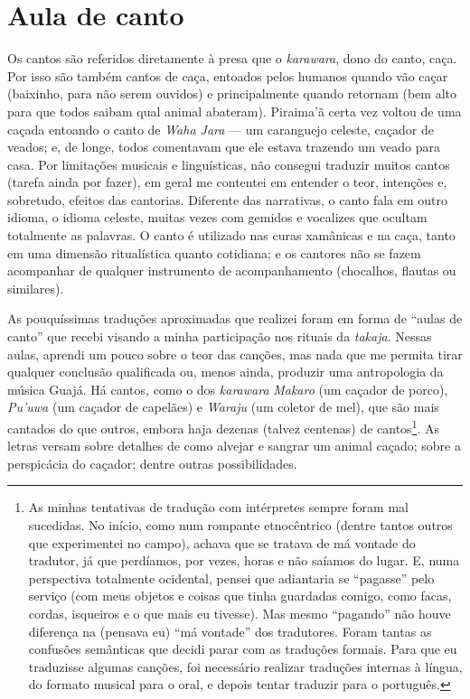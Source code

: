 \section{Aula de canto}

Os cantos são referidos diretamente à presa que o \emph{karawara}, dono
do canto, caça. Por isso são também cantos de caça, entoados pelos
humanos quando vão caçar (baixinho, para não serem ouvidos) e
principalmente quando retornam (bem alto para que todos saibam qual
animal abateram). Piraima'ã certa vez voltou de uma caçada entoando o
canto de \emph{Waha Jara} --- um caranguejo celeste, caçador de veados; e,
de longe, todos comentavam que ele estava trazendo um veado para casa.
Por limitações musicais e linguísticas, não consegui traduzir muitos
cantos (tarefa ainda por fazer), em geral me contentei em entender o
teor, intenções e, sobretudo, efeitos das cantorias. Diferente das
narrativas, o canto fala em outro idioma, o idioma celeste, muitas vezes
com gemidos e vocalizes que ocultam totalmente as palavras. O canto é
utilizado nas curas xamânicas e na caça, tanto em uma dimensão
ritualística quanto cotidiana; e os cantores não se fazem acompanhar de
qualquer instrumento de acompanhamento (chocalhos, flautas ou
similares).

As pouquíssimas traduções aproximadas que realizei foram em forma de
``aulas de canto'' que recebi visando a minha participação nos rituais da
\emph{takaja}. Nessas aulas, aprendi um pouco sobre o teor das canções,
mas nada que me permita tirar qualquer conclusão qualificada ou, menos
ainda, produzir uma antropologia da música Guajá. Há cantos, como o dos
\emph{karawara} \emph{Makaro} (um caçador de porco), \emph{Pu'uwa} (um
caçador de capelães) e \emph{Waraju} (um coletor de mel), que são mais
cantados do que outros, embora haja dezenas (talvez centenas) de
cantos\footnote{As minhas tentativas de tradução com intérpretes sempre
  foram mal sucedidas. No início, como num rompante etnocêntrico (dentre
  tantos outros que experimentei no campo), achava que se tratava de má
  vontade do tradutor, já que perdíamos, por vezes, horas e não saíamos
  do lugar. E, numa perspectiva totalmente ocidental, pensei que
  adiantaria se ``pagasse'' pelo serviço (com meus objetos e coisas que
  tinha guardadas comigo, como facas, cordas, isqueiros e o que mais eu
  tivesse). Mas mesmo ``pagando'' não houve diferença na (pensava eu) ``má
  vontade'' dos tradutores. Foram tantas as confusões semânticas que
  decidi parar com as traduções formais. Para que eu traduzisse algumas
  canções, foi necessário realizar traduções internas à língua, do
  formato musical para o oral, e depois tentar traduzir para o
  português.}. As letras versam sobre detalhes de como alvejar e sangrar
um animal caçado; sobre a perspicácia do caçador; dentre outras
possibilidades.

